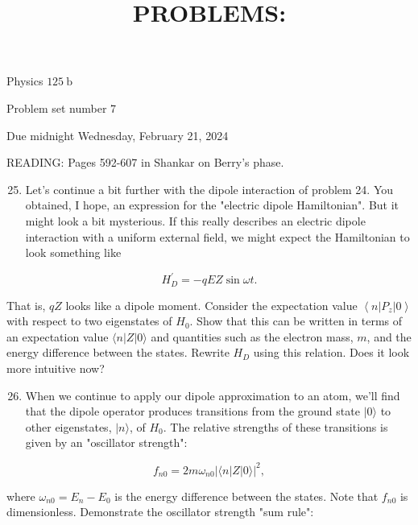 \documentclass[10pt]{article}
\title{PROBLEMS: }
\author{}
\date{}
\begin{document}
\maketitle
Physics $125 \mathrm{~b}$

Problem set number 7

Due midnight Wednesday, February 21, 2024

READING: Pages 592-607 in Shankar on Berry's phase.

\begin{enumerate}
  \setcounter{enumi}{24}
  \item Let's continue a bit further with the dipole interaction of problem 24. You obtained, I hope, an expression for the "electric dipole Hamiltonian". But it might look a bit mysterious. If this really describes an electric dipole interaction with a uniform external field, we might expect the Hamiltonian to look something like
\end{enumerate}


\begin{equation*}
H_{D}^{\prime}=-q E Z \sin \omega t . \tag{1}
\end{equation*}


That is, $q Z$ looks like a dipole moment. Consider the expectation value $\left\langle n\left|P_{z}\right| 0\right\rangle$ with respect to two eigenstates of $H_{0}$. Show that this can be written in terms of an expectation value $\langle n|Z| 0\rangle$ and quantities such as the electron mass, $m$, and the energy difference between the states. Rewrite $H_{D}$ using this relation. Does it look more intuitive now?

\begin{enumerate}
  \setcounter{enumi}{25}
  \item When we continue to apply our dipole approximation to an atom, we'll find that the dipole operator produces transitions from the ground state $|0\rangle$ to other eigenstates, $|n\rangle$, of $H_{0}$. The relative strengths of these transitions is given by an "oscillator strength":
\end{enumerate}


\begin{equation*}
f_{n 0}=2 m \omega_{n 0}|\langle n|Z| 0\rangle|^{2}, \tag{2}
\end{equation*}


where $\omega_{n 0}=E_{n}-E_{0}$ is the energy difference between the states. Note that $f_{n 0}$ is dimensionless. Demonstrate the oscillator strength "sum rule":
\end{document}
